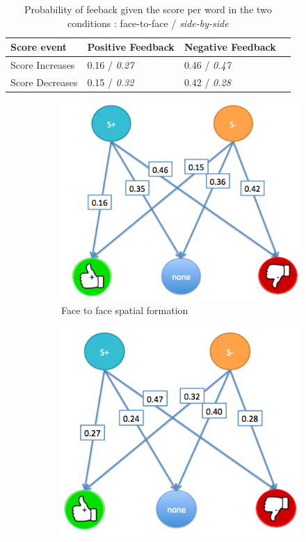 \documentclass[letterpaper, 10 pt, conference]{ieeeconf}  %
\begin{document}
\begin{table}[ht!]
\centering
\caption{\small Probability of feeback given the score per word in  the two conditions : face-to-face / \emph{side-by-side}}
\label{proba}
\begin{tabular}{l|p{2cm}|p{2cm}l@{}}
\toprule
Score event & Positive Feedback & Negative Feedback \\
\midrule
Score Increases & 	0.16 / \emph{0.27}	& 0.46 / \emph{0.47} \\
Score Decreases &	0.15 / \emph{0.32}	& 0.42 / \emph{0.28} \\
\bottomrule
\end{tabular}
\end{table}
\begin{figure}
	\centering
	\begin{subfigure}{0.5\textwidth}
		\centering
		\includegraphics[width=0.8\linewidth]{./figures/faceface_score}
		\caption{Face to face spatial formation}
		\label{fig:f2fstate}
	\end{subfigure}%
	\begin{subfigure}{0.5\textwidth}
		\centering
		\includegraphics[width=0.8\linewidth]{./figures/sidebiside_score}

\end{subfigure}
\end{figure}
\end{document}

